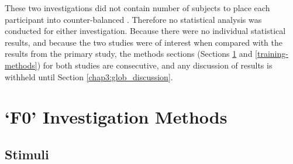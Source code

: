 These two investigations \DIFaddbegin {}\DIFaddend did not contain \DIFdelbegin {}\DIFdelend \DIFaddbegin {}\DIFaddend number of subjects \DIFaddbegin {}\DIFaddend to place each participant into \DIFdelbegin {}\DIFdelend \DIFaddbegin {}\DIFaddend counter-balanced \DIFdelbegin {}\DIFdelend \DIFaddbegin {}\DIFaddend .  Therefore no statistical analysis was conducted for either investigation.  %
Because there were no individual statistical results, and because the two studies were \DIFdelbegin {}\DIFdelend \DIFaddbegin {}\DIFaddend of interest when compared with the results from the primary study, the methods sections (Sections \ref{F0-methods} and \ref{training-methods}) for both studies are consecutive, and any discussion of results is withheld until Section \ref{chap3:glob_discussion}.



\section{`F0' Investigation Methods}
\label{F0-methods}

\subsection{Stimuli}\label{F0-stimuli}

